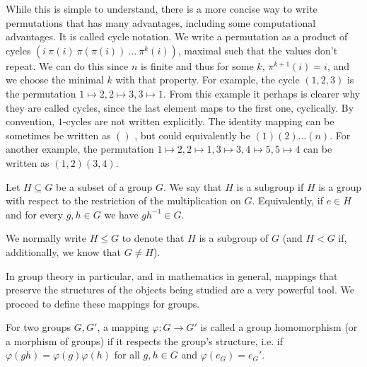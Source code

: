 While this is simple to understand, there is a more concise way to write permutations that has many advantages, including some computational advantages.
It is called cycle notation.
We write a permutation as a product of cycles $(i~\pi(i) ~ \pi(\pi(i)) ~ \ldots ~ \pi^k(i))$, maximal such that the values don't repeat. We can do this since $n$ is finite and thus for some $k$, $\pi^{k+1}(i)  = i$, and we choose the minimal $k$ with that property.
For example, the cycle $(1,2,3)$ is the permutation $1 \mapsto 2, 2 \mapsto 3, 3 \mapsto 1$.
From this example it perhaps is clearer why they are called cycles, since the last element maps to the first one, cyclically.
By convention, $1$-cycles are not written explicitly. The identity mapping can be sometimes be written as $()$ , but could equivalently be $(1)(2)\ldots(n)$.
For another example, the permutation $1 \mapsto 2, 2 \mapsto 1, 3 \mapsto 3, 4 \mapsto 5, 5 \mapsto 4$ can be written as $(1,2)(3,4)$.

\begin{defn}
Let $H \subseteq G$ be a subset of a group $G$.
We say that $H$ is a subgroup if $H$ is a group with respect to the restriction of the multiplication on $G$.
Equivalently, if $e \in H$ and for every $g, h \in G$ we have $g h^{-1} \in G$.
\end{defn}

We normally write $H \leq G$ to denote that $H$ is a subgroup of $G$ (and $H < G$ if, additionally, we know that $G \neq H$).

In group theory in particular, and in mathematics in general, mappings that preserve the structures of the objects being studied are a very powerful tool.
We proceed to define these mappings for groups.

\begin{defn}
For two groups $G, G'$, a mapping $\varphi : G \rightarrow G'$ is called a group homomorphism (or a morphism of groups) if it respects the group's structure, i.e. 
if $\varphi(gh) = \varphi(g) \varphi(h)$ for all $g,h \in G$ and $\varphi(e_G) = e_G'$. 
\end{defn}

